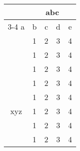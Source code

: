 \documentclass[a4paper,11pt]{article}
\begin{document}
\begin{table}[htbp]
\label{Tab:SRNRValues}
\begin{center}
\begin{tabular}{c|c|c|c|c}
\hline
& \multicolumn{1}{c|}{ } & \multicolumn{2}{c|}{abc} & \\ \cline{3-4}
\multirow{6}{*}{pgr} 
a & b & c & d & e \\ \hline
& 1 & 2 & 3 & 4 \\
& 1 & 2 & 3 & 4 \\
& 1 & 2 & 3 & 4 \\
\multirow{6}{*}{xyz}
& 1 & 2 & 3 & 4 \\ \hline
& 1 & 2 & 3 & 4 \\
& 1 & 2 & 3 & 4 \\
& 1 & 2 & 3 & 4 \\
& 1 & 2 & 3 & 4 \\ \hline
\end{tabular}
\end{center}
\end{table}
\end{document}
